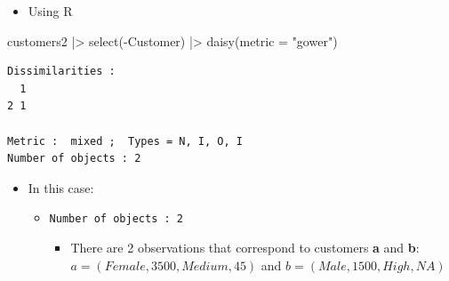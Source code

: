 \documentclass[
  ignorenonframetext,
]{beamer}
\newenvironment{Shaded}{\begin{snugshade}}{\end{snugshade}}
\newcommand{\AttributeTok}[1]{\textcolor[rgb]{0.40,0.45,0.13}{#1}}
\newcommand{\FunctionTok}[1]{\textcolor[rgb]{0.28,0.35,0.67}{#1}}
\newcommand{\NormalTok}[1]{\textcolor[rgb]{0.00,0.23,0.31}{#1}}
\newcommand{\SpecialCharTok}[1]{\textcolor[rgb]{0.37,0.37,0.37}{#1}}
\newcommand{\StringTok}[1]{\textcolor[rgb]{0.13,0.47,0.30}{#1}}
\providecommand{\tightlist}{%
  \setlength{\itemsep}{0pt}\setlength{\parskip}{0pt}}\usepackage{longtable,booktabs,array}
\begin{document}
\begin{frame}[fragile]{}
\label{section-18}
\begin{itemize}
\tightlist
\item
  Using R
\end{itemize}

\tiny

\begin{Shaded}
\begin{Highlighting}[]
\NormalTok{customers2 }\SpecialCharTok{|\textgreater{}}
  \FunctionTok{select}\NormalTok{(}\SpecialCharTok{{-}}\NormalTok{Customer) }\SpecialCharTok{|\textgreater{}}
  \FunctionTok{daisy}\NormalTok{(}\AttributeTok{metric =} \StringTok{"gower"}\NormalTok{)}
\end{Highlighting}
\end{Shaded}

\begin{verbatim}
Dissimilarities :
  1
2 1

Metric :  mixed ;  Types = N, I, O, I 
Number of objects : 2
\end{verbatim}

\normalsize

\begin{itemize}
\item
  In this case:

  \begin{itemize}
  \item
    \texttt{Number\ of\ objects\ :\ 2}

    \begin{itemize}
    \tightlist
    \item
      There are 2 observations that correspond to customers \textbf{a}
      and \textbf{b}: \(a = (Female, 3500, Medium, 45)\) and
      \(b = (Male, 1500, High, NA)\)
    \end{itemize}
  \end{itemize}
\end{itemize}
\end{frame}
\end{document}
